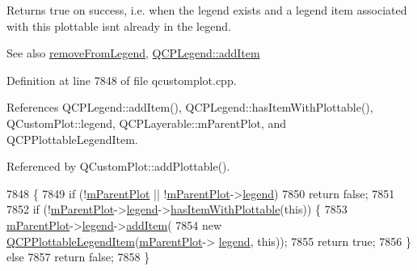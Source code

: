 Returns true on success, i.\+e. when the legend exists and a legend item associated with this plottable isn\textquotesingle{}t already in the legend.

\begin{DoxySeeAlso}{See also}
\hyperlink{class_q_c_p_abstract_plottable_aa1f350e510326d012b9a9c9249736c83}{remove\+From\+Legend}, \hyperlink{class_q_c_p_legend_a3ab274de52d2951faea45a6d975e6b3f}{Q\+C\+P\+Legend\+::add\+Item} 
\end{DoxySeeAlso}


Definition at line 7848 of file qcustomplot.\+cpp.



References Q\+C\+P\+Legend\+::add\+Item(), Q\+C\+P\+Legend\+::has\+Item\+With\+Plottable(), Q\+Custom\+Plot\+::legend, Q\+C\+P\+Layerable\+::m\+Parent\+Plot, and Q\+C\+P\+Plottable\+Legend\+Item.



Referenced by Q\+Custom\+Plot\+::add\+Plottable().


\begin{DoxyCode}
7848                                        \{
7849   \textcolor{keywordflow}{if} (!\hyperlink{class_q_c_p_layerable_aa2a528433e44db02b8aef23c1f9f90ed}{mParentPlot} || !\hyperlink{class_q_c_p_layerable_aa2a528433e44db02b8aef23c1f9f90ed}{mParentPlot}->\hyperlink{class_q_custom_plot_a4eadcd237dc6a09938b68b16877fa6af}{legend})
7850     \textcolor{keywordflow}{return} \textcolor{keyword}{false};
7851 
7852   \textcolor{keywordflow}{if} (!\hyperlink{class_q_c_p_layerable_aa2a528433e44db02b8aef23c1f9f90ed}{mParentPlot}->\hyperlink{class_q_custom_plot_a4eadcd237dc6a09938b68b16877fa6af}{legend}->\hyperlink{class_q_c_p_legend_a2eb1d24bdf5658e64962a656303fd61a}{hasItemWithPlottable}(\textcolor{keyword}{this})) \{
7853     \hyperlink{class_q_c_p_layerable_aa2a528433e44db02b8aef23c1f9f90ed}{mParentPlot}->\hyperlink{class_q_custom_plot_a4eadcd237dc6a09938b68b16877fa6af}{legend}->\hyperlink{class_q_c_p_legend_a3ab274de52d2951faea45a6d975e6b3f}{addItem}(
7854         \textcolor{keyword}{new} \hyperlink{class_q_c_p_abstract_plottable_a104c78e91302afd6842a903e472f552f}{QCPPlottableLegendItem}(\hyperlink{class_q_c_p_layerable_aa2a528433e44db02b8aef23c1f9f90ed}{mParentPlot}->
      \hyperlink{class_q_custom_plot_a4eadcd237dc6a09938b68b16877fa6af}{legend}, \textcolor{keyword}{this}));
7855     \textcolor{keywordflow}{return} \textcolor{keyword}{true};
7856   \} \textcolor{keywordflow}{else}
7857     \textcolor{keywordflow}{return} \textcolor{keyword}{false};
7858 \}
\end{DoxyCode}


